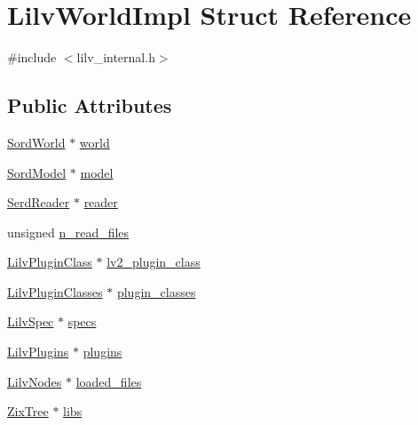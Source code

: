 \hypertarget{struct_lilv_world_impl}{}\section{Lilv\+World\+Impl Struct Reference}
\label{struct_lilv_world_impl}


{\ttfamily \#include $<$lilv\+\_\+internal.\+h$>$}

\subsection*{Public Attributes}
\begin{DoxyCompactItemize}
\item 
\hyperlink{group__sord_ga133d918ec58f829198b2cf65f250ed69}{Sord\+World} $\ast$ \hyperlink{struct_lilv_world_impl_a568e68967d35a64821393e5015e826cf}{world}
\item 
\hyperlink{group__sord_gaea018cfebfedd10280b1d8dd6d650a28}{Sord\+Model} $\ast$ \hyperlink{struct_lilv_world_impl_a02f0eae0ade595968f72e721607b1e17}{model}
\item 
\hyperlink{group__serd_ga69c709eacb062f9e7777726ec80b2796}{Serd\+Reader} $\ast$ \hyperlink{struct_lilv_world_impl_a5b976de1264ae35d7d33234379a72e8c}{reader}
\item 
unsigned \hyperlink{struct_lilv_world_impl_a5d4e571898e7420c1d01c98a5e291853}{n\+\_\+read\+\_\+files}
\item 
\hyperlink{lilv_8h_a94da06d43a4f980af280b9d8bf4ae1f0}{Lilv\+Plugin\+Class} $\ast$ \hyperlink{struct_lilv_world_impl_a5f1ff516780893a39fd971fab50ccb15}{lv2\+\_\+plugin\+\_\+class}
\item 
\hyperlink{lilv_8h_a1ef5389c0a24cb8e0adcf971d2d12f0e}{Lilv\+Plugin\+Classes} $\ast$ \hyperlink{struct_lilv_world_impl_a56486065a8949f93f060216ab347938f}{plugin\+\_\+classes}
\item 
\hyperlink{lilv__internal_8h_acc502002d6225972f5e26702c795a9ba}{Lilv\+Spec} $\ast$ \hyperlink{struct_lilv_world_impl_ac0fa9fc4e090d3de71a95a4e4f73a5a6}{specs}
\item 
\hyperlink{lilv_8h_ae2c6def8207facadef355b47b8802911}{Lilv\+Plugins} $\ast$ \hyperlink{struct_lilv_world_impl_aa65d3df57cecae9da8bf6607ef7427e9}{plugins}
\item 
\hyperlink{lilv_8h_a256c2c4443307f320de24bb31198df83}{Lilv\+Nodes} $\ast$ \hyperlink{struct_lilv_world_impl_a1f6216ac5e02a5edd68bd8fa6aa01438}{loaded\+\_\+files}
\item 
\hyperlink{group__zix_ga684b19fdde4e1e069abd68304fa9518c}{Zix\+Tree} $\ast$ \hyperlink{struct_lilv_world_impl_a1a9073ae17286636dd838e79121daef7}{libs}

\end{DoxyCompactItemize}
